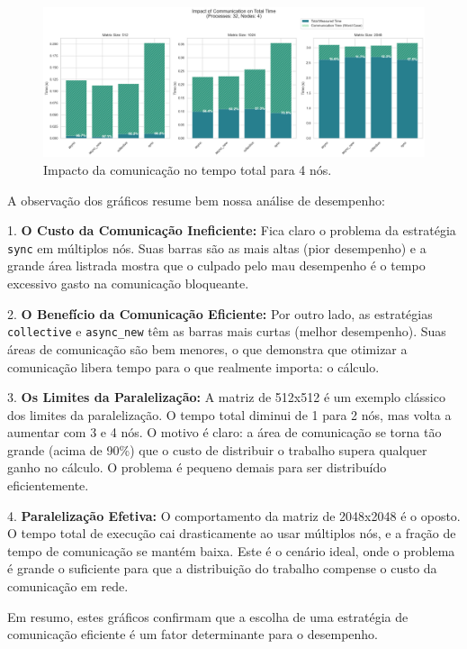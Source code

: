 \documentclass{article}
\begin{document}
\begin{figure}[H]
    \centering
    \includegraphics[width=1\linewidth]{images/comm_impact_4nodes.png}
    \caption{Impacto da comunicação no tempo total para 4 nós.}
    \label{fig:impact_4nodes}
\end{figure}

A observação dos gráficos resume bem nossa análise de desempenho:

1.  \textbf{O Custo da Comunicação Ineficiente:} Fica claro o problema da estratégia \texttt{sync} em múltiplos nós. Suas barras são as mais altas (pior desempenho) e a grande área listrada mostra que o culpado pelo mau desempenho é o tempo excessivo gasto na comunicação bloqueante.

2.  \textbf{O Benefício da Comunicação Eficiente:} Por outro lado, as estratégias \texttt{collective} e \texttt{async\_new} têm as barras mais curtas (melhor desempenho). Suas áreas de comunicação são bem menores, o que demonstra que otimizar a comunicação libera tempo para o que realmente importa: o cálculo.

3.  \textbf{Os Limites da Paralelização:} A matriz de 512x512 é um exemplo clássico dos limites da paralelização. O tempo total diminui de 1 para 2 nós, mas volta a aumentar com 3 e 4 nós. O motivo é claro: a área de comunicação se torna tão grande (acima de 90\%) que o custo de distribuir o trabalho supera qualquer ganho no cálculo. O problema é pequeno demais para ser distribuído eficientemente.

4.  \textbf{Paralelização Efetiva:} O comportamento da matriz de 2048x2048 é o oposto. O tempo total de execução cai drasticamente ao usar múltiplos nós, e a fração de tempo de comunicação se mantém baixa. Este é o cenário ideal, onde o problema é grande o suficiente para que a distribuição do trabalho compense o custo da comunicação em rede.

Em resumo, estes gráficos confirmam que a escolha de uma estratégia de comunicação eficiente é um fator determinante para o desempenho.
\end{document}
